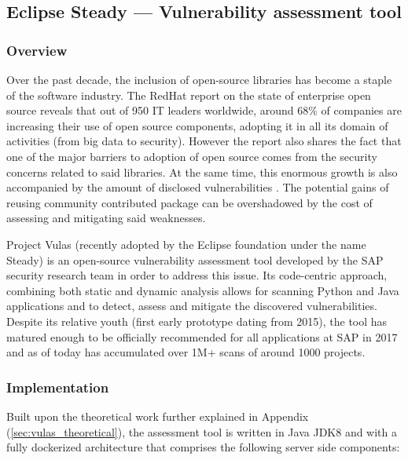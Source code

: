 \documentclass[11pt]{article}
\begin{document}
\subsection{Eclipse Steady — Vulnerability assessment tool}
\subsubsection{Overview}

\hspace{5mm}Over the past decade, the inclusion of open-source libraries has become a staple of the software industry. The RedHat report on the state of enterprise open source \cite{RedHat} reveals that out of 950 IT leaders worldwide, around 68\% of companies are increasing their use of open source components, adopting it in all its domain of activities (from big data to security). However the report also shares the fact that one of the major barriers to adoption of open source comes from the security concerns related to said libraries. At the same time, this enormous growth is also accompanied by the amount of disclosed vulnerabilities \cite{Snyk}. The potential gains of reusing community contributed package can be overshadowed by the cost of assessing and mitigating said weaknesses. 

Project Vulas (recently adopted by the Eclipse foundation under the name Steady) is an open-source vulnerability assessment tool developed by the SAP security research team in order to address this issue. Its code-centric approach, combining both static and dynamic analysis allows for scanning Python and Java applications and to detect, assess and mitigate the discovered vulnerabilities. Despite its relative youth (first early prototype dating from 2015), the tool has matured enough to be officially recommended for all applications at SAP in 2017 and as of today has accumulated over 1M+ scans of around 1000 projects.

\subsubsection{Implementation} \label{implementation}

\hspace{5mm} Built upon the theoretical work further explained in Appendix (\ref{sec:vulas_theoretical}), the assessment tool is written in Java JDK8 and with a fully dockerized architecture that comprises the following server side components:
\end{document}

